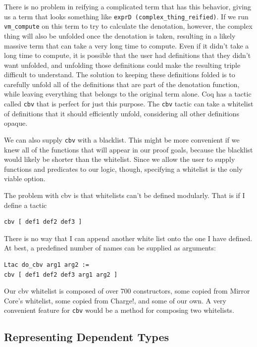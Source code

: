 \documentclass{puthesis}
\begin{document}
There is no problem in reifying a complicated term that has this behavior, giving
us a term that looks something like 
\lstinline|exprD (complex_thing_reified)|. 
If we run \lstinline|vm_compute| on this
term to try to calculate the denotation, however, the complex thing will also be
unfolded once the denotation is taken, resulting in a likely massive term
that can take a very long time to compute. Even if it didn't take a
long time to compute, it is possible that the user had definitions
that they didn't want unfolded, and unfolding those definitions could
make the resulting triple difficult to understand.
The solution to keeping these definitions folded is to
carefully unfold all of the definitions that are part of the
denotation function, while leaving everything that belongs to the
original term alone. Coq has a tactic called \lstinline|cbv| that is
perfect for just this purpose. The \lstinline|cbv| tactic can take a
whitelist of definitions that it should efficiently unfold,
considering all other definitions opaque.

We can also supply \lstinline|cbv| with a blacklist. This might be
more convenient if we knew all of the functions that will appear in
our proof goals, because the blacklist would likely be shorter than
the whitelist. Since we allow the user to supply functions and
predicates to our logic, though, specifying a whitelist is the only
viable option.

The problem with cbv is that whitelists can't be defined
modularly. That is if I define a tactic 

\begin{lstlisting}
cbv [ def1 def2 def3 ]
\end{lstlisting}

There is no way that I can append another white list onto the one I have
defined. At best, a predefined number of names can be supplied as
arguments:

\begin{lstlisting}
Ltac do_cbv arg1 arg2 :=
cbv [ def1 def2 def3 arg1 arg2 ]
\end{lstlisting}

Our cbv whitelist is composed of over 700 constructors, some
copied from Mirror Core's whitelist, some copied from Charge!, and
some of our own. A very convenient feature for \lstinline|cbv| would
be a method for composing two whitelists.

\subsection{Representing Dependent Types}
\label{sub:dependent}
\end{document}

